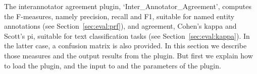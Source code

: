 
%
%
%
%
%
%


The interannotator agreement plugin, `Inter\_Annotator\_Agreement', computes the
F-measures, namely precision, recall and F1, suitable for named entity
annotations (see Section~\ref{sec:eval:prf}), and agreement, Cohen's kappa and
Scott's pi, suitable for text classification tasks (see
Section~\ref{sec:eval:kappa}). In the latter case, a confusion matrix is also
provided. In this section we describe those measures and the output results from
the plugin. But first we explain how to load the plugin, and the input to and the
parameters of the plugin.

